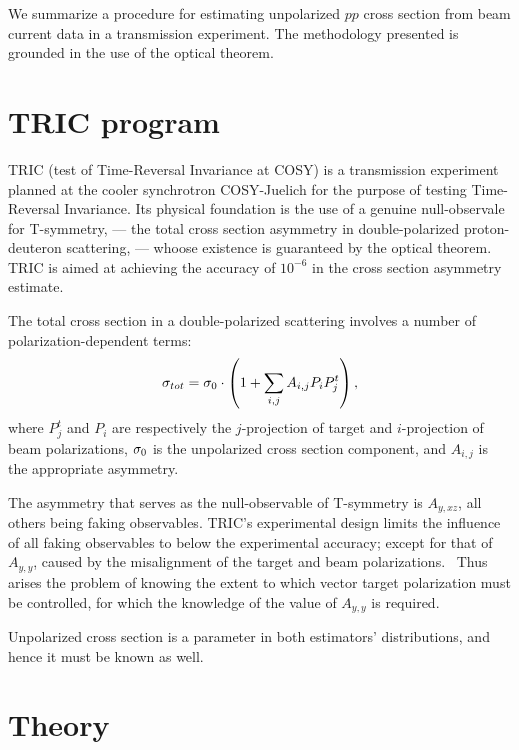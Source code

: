 \documentclass[reprint]{revtex4-1}
\begin{document}
\begin{abstractname}
We summarize a procedure for estimating unpolarized $pp$ cross section from beam current data in a transmission experiment. The methodology presented is grounded in the use of the optical theorem.
\end{abstractname}

\section{TRIC program}

TRIC (test of Time-Reversal Invariance at COSY) is a transmission experiment planned at the cooler synchrotron COSY-Juelich for the purpose of testing Time-Reversal Invariance. Its physical foundation is the use of a genuine null-observale for T-symmetry, --- the total cross section asymmetry in double-polarized proton-deuteron scattering, --- whoose existence is guaranteed by the optical theorem.~\cite{Conzett} TRIC is aimed at achieving the accuracy of $10^{-6}$ in the cross section asymmetry estimate.

The total cross section in a double-polarized scattering involves a number of polarization-dependent terms:
\[
	\CS[tot] = \CS[0]\cdot\bkt{1 + \sum_{i,j} A_{i,j} P_iP^t_j},
\]
where $P^t_j$ and $P_i$ are respectively the $j$-projection of target and $i$-projection of beam polarizations, $\CS[0]$ is the unpolarized cross section component, and $A_{i,j}$ is the appropriate asymmetry.

The asymmetry that serves as the null-observable of T-symmetry is $A_{y,xz}$, all others being faking observables. TRIC's experimental design limits the influence of all faking observables to below the experimental accuracy; except for that of $A_{y,y}$, caused by the misalignment of the target and beam polarizations.~\cite[p. 11]{Proposal} Thus arises the problem of knowing the extent to which vector target polarization must be controlled, for which the knowledge of the value of $A_{y,y}$ is required. 

Unpolarized cross section is a parameter in both estimators' distributions, and hence it must be known as well. 

\section{Theory}
\end{document}
